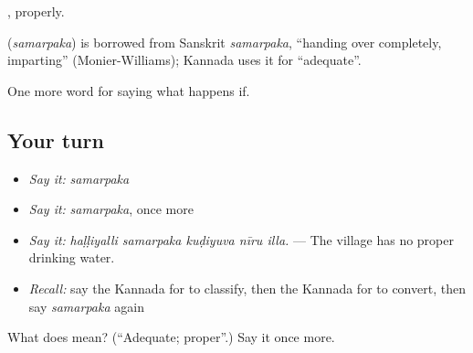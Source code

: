 , properly.

\begin{cousinweb}
\textbf{} (\emph{samarpaka}) is borrowed from Sanskrit \emph{samarpaka}, \textquotedblleft{}handing over completely, imparting\textquotedblright{} (Monier-Williams); Kannada uses it for \textquotedblleft{}adequate\textquotedblright{}.
\end{cousinweb}

\begin{grammarlens}[title={What you've built}]
One more word for saying what happens if.
\end{grammarlens}

\subsection*{Your turn}
\begin{itemize}
\raggedright
  \item \emph{Say it:} \emph{samarpaka}
  \item \emph{Say it:} \emph{samarpaka}, once more
  \item \emph{Say it:} \emph{haḷḷiyalli samarpaka kuḍiyuva nīru illa.} — The village has no proper drinking water.
  \item \emph{Recall:} say the Kannada for to classify, then the Kannada for to convert, then say \emph{samarpaka} again
\end{itemize}

\begin{tcolorbox}[breakable,colback=teal!4,colframe=teal!35!black,title={Before you move on}]
What does  mean? (\textquotedblleft{}Adequate; proper\textquotedblright{}.) Say it once more.
\end{tcolorbox}
